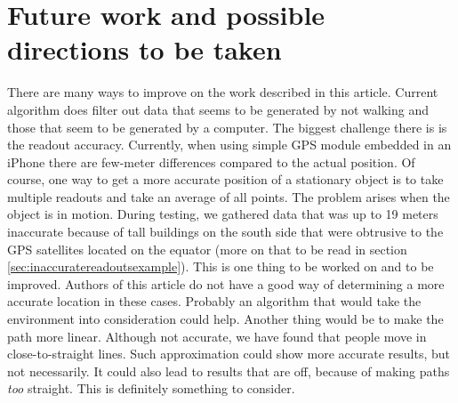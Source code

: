 \section{Future work and possible directions to be taken} \label{sec:futurework}
There are many ways to improve on the work described in this article. Current algorithm does filter out data that seems to be generated by not walking and those that seem to be generated by a computer. The biggest challenge there is is the readout accuracy. Currently, when using simple GPS module embedded in an iPhone there are few-meter differences compared to the actual position. Of course, one way to get a more accurate position of a stationary object is to take multiple readouts and take an average of all points. The problem arises when the object is in motion. During testing, we gathered data that was up to 19 meters inaccurate because of tall buildings on the south side that were obtrusive to the GPS satellites located on the equator (more on that to be read in section \ref{sec:inaccuratereadoutsexample}). This is one thing to be worked on and to be improved. Authors of this article do not have a good way of determining a more accurate location in these cases. Probably an algorithm that would take the environment into consideration could help. Another thing would be to make the path more linear. Although not accurate, we have found that people move in close-to-straight lines. Such approximation could show more accurate results, but not necessarily. It could also lead to results that are off, because of making paths \textit{too} straight. This is definitely something to consider.
